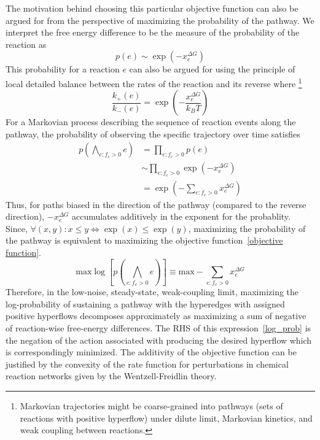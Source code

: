 The motivation behind choosing this particular objective function can also be argued for from the perspective of maximizing the probability of the pathway.
We interpret the free energy difference to be the measure of the probability of the reaction as
\begin{equation}
    p(e) \sim \exp\left(-x^{\Delta G}_e\right)
    \label{prob_transition}
\end{equation}
This probability for a reaction $e$ can also be argued for using the principle of local detailed balance between the rates of the reaction and its reverse where \footnote{Markovian trajectories might be coarse-grained into pathways (sets of reactions with positive hyperflow) under dilute limit, Markovian kinetics, and weak coupling between reactions.}
\begin{equation*}
    \frac{k_+(e)}{k_-(e)} = \exp\left(-\frac{x^{\Delta G}_e}{k_B T}\right)
\end{equation*}
For a Markovian process describing the sequence of reaction events along the pathway, the probability of observing the specific trajectory over time satisfies
\begin{align*}
    p\left(\bigwedge_{e\colon f_e > 0} e\right) &= \prod_{e: f_e > 0} p(e) \\
    &\sim \prod_{e\colon f_e > 0} \exp\left(-x^{\Delta G}_e\right) \\
    &= \exp\left(- \sum_{e: f_e > 0} x^{\Delta G}_e\right)
\end{align*}
Thus, for paths biased in the direction of the pathway (compared to the reverse direction), $-x^{\Delta G}_e$ accumulates additively in the exponent for the probablity.
Since, $\forall (x, y)\colon  x\leq y \iff \exp(x) \leq \exp(y)$,
maximizing the probability of the pathway is equivalent to maximizing the objective function~\eqref{objective function}.
\begin{equation*}
    \text{max} \log \left[p\left(\bigwedge_{e\colon f_e > 0} e\right)\right] \equiv \text{max} - \sum_{e: f_e > 0} x^{\Delta G}_e
    \label{log_prob}
\end{equation*}
Therefore, in the low-noise, steady-state, weak-coupling limit, maximizing the log-probability of sustaining a pathway with the hyperedges with assigned positive hyperflows decomposes approximately as maximizing a sum of negative of reaction-wise free-energy differences. The RHS of this expression~\eqref{log_prob} is the negation of the action associated with producing the desired hyperflow which is correspondingly minimized. The additivity of the objective function can be justified by the convexity of the rate function for perturbations in chemical reaction networks given by the Wentzell-Freidlin theory.~\cite{convex_rate_law}

